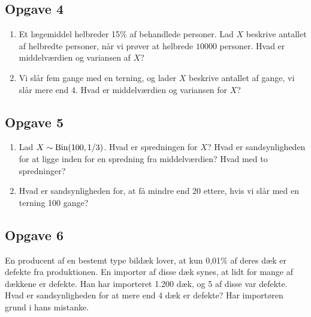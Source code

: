 \subsection*{Opgave 4}
\begin{enumerate}[label=\roman*)]
\item Et lægemiddel helbreder 15$\%$ af behandlede personer. Lad $X$ beskrive antallet af helbredte personer, når vi prøver at helbrede $10000$ personer. Hvad er middelværdien og variansen af $X$?
\item Vi slår fem gange med en terning, og lader $X$ beskrive antallet af gange, vi slår mere end 4. Hvad er middelværdien og variansen for $X$?

\end{enumerate}


\subsection*{Opgave 5}
\begin{enumerate}[label=\roman*)]
\item Lad $X\sim \textnormal{Bin}(100,1/3)$. Hvad er spredningen for $X$? Hvad er sandsynligheden for at ligge inden for en spredning fra middelværdien? Hvad med to spredninger? 
\item Hvad er sandsynligheden for, at få mindre end 20 ettere, hvis vi slår med en terning 100 gange?
\end{enumerate}
\subsection*{Opgave 6}
En producent af en bestemt type bildæk lover, at kun 0,01$\%$ af deres dæk er defekte fra produktionen. En importør af disse dæk synes, at lidt for mange af dækkene er defekte. Han har importeret 1.200 dæk, og 5 af disse var defekte. Hvad er sandsynligheden for at mere end 4 dæk er defekte? Har importøren grund i hans mistanke.
